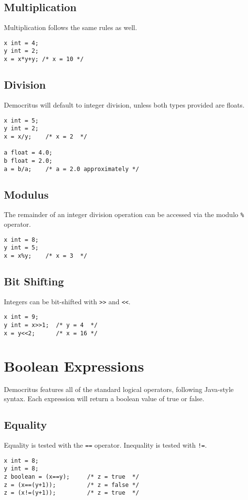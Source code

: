 		\subsection{Multiplication}
			Multiplication follows the same rules as well. 
			\begin{lstlisting}
x int = 4;
y int = 2;
x = x*y+y; /* x = 10 */
			\end{lstlisting}
			

		\subsection{Division}
			Democritus will default to integer division, unless both types provided are floats. 
			\begin{lstlisting}
x int = 5;
y int = 2;
x = x/y; 	/* x = 2  */

a float = 4.0;
b float = 2.0;
a = b/a; 	/* a = 2.0 approximately */
			\end{lstlisting}

        \subsection{Modulus}
            The remainder of an integer division operation can be accessed via the modulo \texttt{\%} operator. 
            \begin{lstlisting}
x int = 8;
y int = 5;
x = x%y; 	/* x = 3  */
			\end{lstlisting}
	
		\subsection{Bit Shifting}
			Integers can be bit-shifted with \texttt{\textgreater\textgreater} and \texttt{\textless\textless}.
			\begin{lstlisting}
x int = 9;
y int = x>>1;  /* y = 4  */
x = y<<2; 	   /* x = 16 */
			\end{lstlisting}
		
	\section{Boolean Expressions}
		Democritus features all of the standard logical operators, following Java-style syntax. Each expression will return a boolean value of true or false.

        \subsection{Equality}
            Equality is tested with the \texttt{==} operator. Inequality is tested with \texttt{!=}. 
            \begin{lstlisting}
x int = 8;
y int = 8;
z boolean = (x==y);  	/* z = true  */
z = (x==(y+1));         /* z = false */
z = (x!=(y+1));         /* z = true  */
			\end{lstlisting}
			
